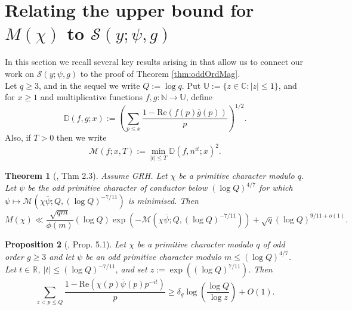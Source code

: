 \documentclass[10pt]{amsart}
\newtheorem{thm}{Theorem}[section]
\newtheorem{prop}[thm]{Proposition}
\theoremstyle{definition}
\newcommand{\ra}{\rightarrow}
\newcommand{\mc}{\mathcal}
\newcommand{\mb}{\mathbb}
\renewcommand{\bar}{\overline}
\begin{document}
\section{Relating the upper bound for $M(\chi)$ to $\mc{S}(y;\psi,g)$}
In this section we recall several key results arising in \cite{LamMan} that allow us to connect our work on $\mc{S}(y;\psi,g)$ to the proof of Theorem \ref{thm:oddOrdMag}.\\
Let $q \geq 3$, and in the sequel we write 
$Q := \log q$.
Put $\mb{U} := \{z \in \mb{C} : |z| \leq 1\}$, and for $x \geq 1$ and multiplicative functions $f,g : \mb{N} \ra \mb{U}$, define
$$
\mb{D}(f,g;x) := \left(\sum_{p \leq x} \frac{1-\text{Re}(f(p)\bar{g}(p))}{p}\right)^{1/2}.
$$
Also, if $T >0$
then we write
$$
\mc{M}(f;x,T) := \min_{|t| \leq T} \mb{D}(f,n^{it};x)^2. 
$$
\begin{thm}[\cite{LamMan}, Thm 2.3] \label{thm:LMUpp}
Assume GRH. Let $\chi$ be a primitive character modulo $q$. Let $\psi$ be the odd primitive character of conductor below $(\log Q)^{4/7}$ for which $\psi \mapsto \mc{M}(\chi\bar{\psi};Q, (\log Q)^{-7/11})$ is minimised. Then
$$
M(\chi) \ll \frac{\sqrt{qm}}{\phi(m)}(\log Q) \exp\left(-\mc{M}(\chi\bar{\psi}; Q,(\log Q)^{-7/11})\right) + \sqrt{q}(\log Q)^{9/11 + o(1)}.
$$
\end{thm}
\begin{prop}[\cite{LamMan}, Prop. 5.1]  \label{prop:MxT}
Let $\chi$ be a primitive character modulo $q$ of odd order $g \geq 3$ and let $\psi$ be an odd primitive character modulo $m \leq (\log Q)^{4/7}$. Let $t \in \mb{R}$, $|t| \leq (\log Q)^{-7/11}$, and set $z := \exp((\log Q)^{7/11})$. Then
$$
\sum_{z < p \leq Q} \frac{1-\text{Re}(\chi(p)\bar{\psi}(p)p^{-it})}{p} \geq \delta_g \log\left(\frac{\log Q}{\log z}\right) + O(1).
$$
\end{prop}
\end{document}
